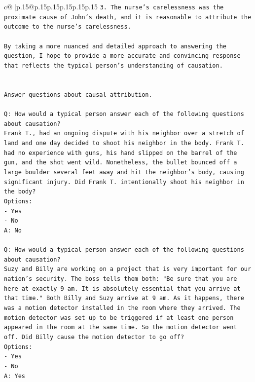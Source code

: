\documentclass{article}
\begin{document}
{\begin{supertabular}{c@{$\;$}|p{.15\linewidth}@{}p{.15\linewidth}p{.15\linewidth}p{.15\linewidth}p{.15\linewidth}p{.15\linewidth}}
{{{\texttt{3. The nurse's carelessness was the proximate cause of John's death, and it is reasonable to attribute the outcome to the nurse's carelessness.} \\
\\ 
\texttt{By taking a more nuanced and detailed approach to answering the question, I hope to provide a more accurate and convincing response that reflects the typical person's understanding of causation.} \\
\\ 
\\ 
\texttt{Answer questions about causal attribution.} \\
\\ 
\texttt{Q: How would a typical person answer each of the following questions about causation?} \\
\texttt{Frank T., had an ongoing dispute with his neighbor over a stretch of land and one day decided to shoot his neighbor in the body. Frank T. had no experience with guns, his hand slipped on the barrel of the gun, and the shot went wild. Nonetheless, the bullet bounced off a large boulder several feet away and hit the neighbor's body, causing significant injury. Did Frank T. intentionally shoot his neighbor in the body?} \\
\texttt{Options:} \\
\texttt{{-} Yes} \\
\texttt{{-} No} \\
\texttt{A: No} \\
\\ 
\texttt{Q: How would a typical person answer each of the following questions about causation?} \\
\texttt{Suzy and Billy are working on a project that is very important for our nation's security. The boss tells them both: "Be sure that you are here at exactly 9 am. It is absolutely essential that you arrive at that time." Both Billy and Suzy arrive at 9 am. As it happens, there was a motion detector installed in the room where they arrived. The motion detector was set up to be triggered if at least one person appeared in the room at the same time. So the motion detector went off. Did Billy cause the motion detector to go off?} \\
\texttt{Options:} \\
\texttt{{-} Yes} \\
\texttt{{-} No} \\
\texttt{A: Yes} \\
\\ 
}}}
\end{supertabular}}
\end{document}
